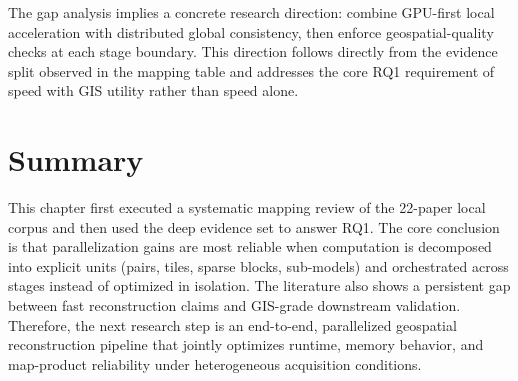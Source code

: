 The gap analysis implies a concrete research direction: combine GPU-first local acceleration with distributed global consistency, then enforce geospatial-quality checks at each stage boundary. This direction follows directly from the evidence split observed in the mapping table and addresses the core RQ1 requirement of speed with GIS utility rather than speed alone.

\section{Summary}

This chapter first executed a systematic mapping review of the 22-paper local corpus and then used the deep evidence set to answer RQ1. The core conclusion is that parallelization gains are most reliable when computation is decomposed into explicit units (pairs, tiles, sparse blocks, sub-models) and orchestrated across stages instead of optimized in isolation. The literature also shows a persistent gap between fast reconstruction claims and GIS-grade downstream validation. Therefore, the next research step is an end-to-end, parallelized geospatial reconstruction pipeline that jointly optimizes runtime, memory behavior, and map-product reliability under heterogeneous acquisition conditions.
